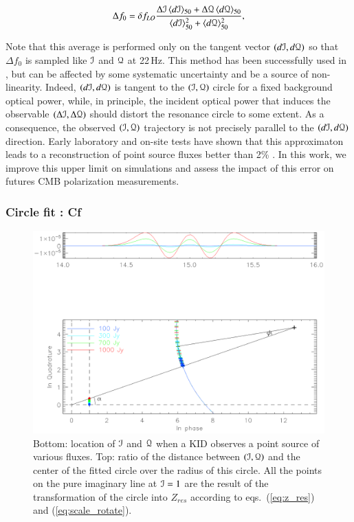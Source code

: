 \begin{equation}
\label{eq:Rf}
\Delta f_{0} = \delta f_{LO} \frac{\Delta \mathcal{I}\, \langle d\mathcal{I}
  \rangle_{50}
+ \Delta \mathcal{Q}\, \langle d\mathcal{Q} \rangle_{50}}{\langle d\mathcal{I}
  \rangle_{50}^{2}
 + \langle d\mathcal{Q} \rangle_{50}^{2}},
\end{equation}

Note that this average is performed only on the tangent vector $(d\mathcal{I},d\mathcal{Q})$ so
that $\Delta f_0$ is sampled like $\mathcal{I}$ and $\mathcal{Q}$ at 22\,Hz. This method has been
successfully used in , but can be affected by some systematic
uncertainty and be a source of non-linearity. Indeed, $(d\mathcal{I},d\mathcal{Q})$ is tangent to
the $(\mathcal{I},\mathcal{Q})$ circle for a fixed background optical power, while, in principle,
the incident optical power that induces the observable $(\Delta \mathcal{I}, \Delta \mathcal{Q})$
should distort the resonance circle to some extent. As a consequence, the
observed $(\mathcal{I},\mathcal{Q})$ trajectory is not precisely parallel to the $(d\mathcal{I},d\mathcal{Q})$
direction. Early laboratory and on-site tests have shown that this approximaton
leads to a reconstruction of point source fluxes better than 2\%
\citep{2013A&A...551L..12C}. In this work, we improve this upper limit on
simulations and assess the impact of this error on futures CMB polarization
measurements.

\subsubsection{Circle fit : Cf}

\begin{figure}
\includegraphics[clip, angle=0, width=\columnwidth]{../Figures/circle_zres.eps}
\caption{Bottom: location of $\mathcal{I}$ and $\mathcal{Q}$ when a KID observes a point source of
  various fluxes. Top: ratio of the distance between $(\mathcal{I},\mathcal{Q})$ and the center of
  the fitted circle over the radius of this circle. All the points on the pure
  imaginary line at $\mathcal{I}=1$ are the result of the transformation of the circle
  into $Z_{res}$ according to eqs.~(\ref{eq:z_res}) and
  (\ref{eq:scale_rotate}).}
\label{fig:circle_zres}
\end{figure}

